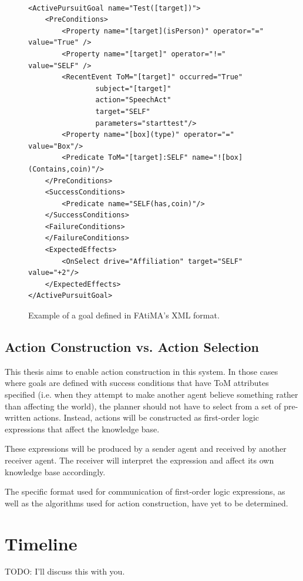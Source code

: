 \documentclass{article}
\begin{document}
\begin{figure}
\lstset{language=XML}
\begin{lstlisting}

<ActivePursuitGoal name="Test([target])">
	<PreConditions>
		<Property name="[target](isPerson)" operator="=" value="True" />
		<Property name="[target]" operator="!=" value="SELF" />
		<RecentEvent ToM="[target]" occurred="True"
                subject="[target]"
                action="SpeechAct"
                target="SELF"
                parameters="starttest"/>
		<Property name="[box](type)" operator="=" value="Box"/>
		<Predicate ToM="[target]:SELF" name="![box](Contains,coin)"/>
	</PreConditions>
	<SuccessConditions>
		<Predicate name="SELF(has,coin)"/>
	</SuccessConditions>
	<FailureConditions>
	</FailureConditions>
	<ExpectedEffects>
		<OnSelect drive="Affiliation" target="SELF" value="+2"/>
	</ExpectedEffects>	
</ActivePursuitGoal>

\end{lstlisting}
\caption{Example of a goal defined in FAtiMA's XML format.}
\label{xml_source_2}
\end{figure}

\subsection{Action Construction vs. Action Selection}

This thesis aims to enable action construction in this system.  In those
cases where goals are defined with success conditions that have ToM
attributes specified (i.e. when they attempt to make another agent
believe something rather than affecting the world), the planner should
not have to select from a set of pre-written actions.  Instead, actions
will be constructed as first-order logic expressions that affect the
knowledge base.

These expressions will be produced by a sender agent and received by another
receiver agent.  The receiver will interpret the expression and affect
its own knowledge base accordingly.

The specific format used for communication of first-order logic expressions,
as well as the algorithms used for action construction, have yet to be determined.

\section{Timeline}

TODO: I'll discuss this with you.


{}
\end{document}
